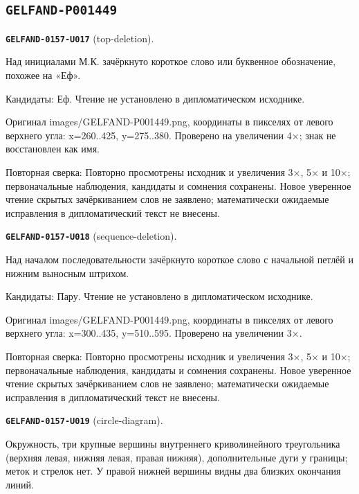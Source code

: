 \subsection*{\texttt{GELFAND-P001449}}
\par\noindent\leavevmode{}\label{GELFAND-0157-U017}\label{GELFAND-P001449:top-deletion}\textbf{\texttt{GELFAND-0157-U017}} (top-deletion).\nopagebreak[4]\par
Над инициалами М.К. зачёркнуто короткое слово или буквенное обозначение, похожее на «Еф».\par
Кандидаты: Еф. Чтение не установлено в дипломатическом исходнике.\par
Оригинал images/GELFAND-P001449.png, координаты в пикселях от левого верхнего угла: x=260..425, y=275..380. Проверено на увеличении 4×; знак не восстановлен как имя.\par
Повторная сверка: Повторно просмотрены исходник и увеличения 3×, 5× и 10×; первоначальные наблюдения, кандидаты и сомнения сохранены. Новое уверенное чтение скрытых зачёркиванием слов не заявлено; математически ожидаемые исправления в дипломатический текст не внесены.\par\medskip
\par\noindent\leavevmode{}\label{GELFAND-0157-U018}\label{GELFAND-P001449:sequence-deletion}\textbf{\texttt{GELFAND-0157-U018}} (sequence-deletion).\nopagebreak[4]\par
Над началом последовательности зачёркнуто короткое слово с начальной петлёй и нижним выносным штрихом.\par
Кандидаты: Пару. Чтение не установлено в дипломатическом исходнике.\par
Оригинал images/GELFAND-P001449.png, координаты в пикселях от левого верхнего угла: x=300..435, y=510..595. Проверено на увеличении 3×.\par
Повторная сверка: Повторно просмотрены исходник и увеличения 3×, 5× и 10×; первоначальные наблюдения, кандидаты и сомнения сохранены. Новое уверенное чтение скрытых зачёркиванием слов не заявлено; математически ожидаемые исправления в дипломатический текст не внесены.\par\medskip
\par\noindent\leavevmode{}\label{GELFAND-0157-U019}\label{GELFAND-P001449:circle-diagram}\textbf{\texttt{GELFAND-0157-U019}} (circle-diagram).\nopagebreak[4]\par
Окружность, три крупные вершины внутреннего криволинейного треугольника (верхняя левая, нижняя левая, правая нижняя), дополнительные дуги у границы; меток и стрелок нет. У правой нижней вершины видны два близких окончания линий.\par
